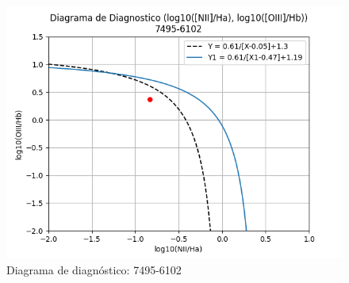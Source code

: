 \documentclass[9pt,twocolumn,a4paper]{opticajnl}
\begin{document}
\begin{figure}
  \begin{center}
    \includegraphics[width=1\linewidth]{../Codigos/diagramasDeDiagnostico/diagramadiag_7495-6102.png}
  \end{center}
  \caption{Diagrama de diagnóstico: 7495-6102}
  \label{fig:diagramadiag_7495-6102}
\end{figure}
\end{document}
